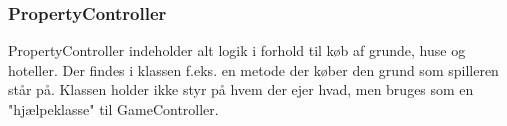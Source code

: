 \subsubsection{PropertyController}
PropertyController indeholder alt logik i forhold til køb af grunde, huse og hoteller. Der findes i klassen f.eks. en metode der køber den grund som spilleren står på. Klassen holder ikke styr på hvem der ejer hvad, men bruges som en "hjælpeklasse" til GameController.
